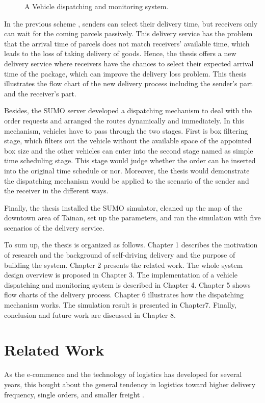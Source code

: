 \documentclass[12pt]{ksthesis}
\begin{document}
\begin{thesis}
{\begin{figure}[t!]
\caption{\large A Vehicle dispatching and monitoring system.}
\vspace{0.5cm}
\label{Fig:System_Overview}
\end{figure}

In the previous scheme \cite{Jiang2018}, senders can select their delivery time, but receivers only can wait for the coming parcels passively. This delivery service has the problem that the arrival time of parcels does not match receivers’ available time, which leads to the loss of taking delivery of goods. Hence, the thesis offers a new delivery service where receivers have the chances to select their expected arrival time of the package, which can improve the delivery loss problem. This thesis illustrates the flow chart of the new delivery process including the sender’s part and the receiver’s part.

Besides, the SUMO server developed a dispatching mechanism to deal with the order requests and arranged the routes dynamically and immediately. In this mechanism, vehicles have to pass through the two stages. First is box filtering stage, which filters out the vehicle without the available space of the appointed box size and the other vehicles can enter into the second stage named as simple time scheduling stage. This stage would judge whether the order can be inserted into the original time schedule or nor. Moreover, the thesis would demonstrate the dispatching mechanism would be applied to the scenario of the sender and the receiver in the different ways.

Finally, the thesis installed the SUMO simulator, cleaned up the map of the downtown area of Tainan, set up the parameters, and ran the simulation with five scenarios of the delivery service.

To sum up, the thesis is organized as follows. Chapter 1 describes the motivation of research and the background of self-driving delivery and the purpose of building the system. Chapter 2 presents the related work. The whole system design overview is proposed in Chapter 3. The implementation of a vehicle dispatching and monitoring system is described in Chapter 4. Chapter 5 shows flow charts of the delivery process.  Chapter 6 illustrates how the dispatching mechanism works. The simulation result is presented in Chapter7. Finally, conclusion and future work are discussed in Chapter 8.


  


\chapter{Related Work} \label{Chap:Related}
As the e-commence and the technology of logistics has developed for several years, this bought about the general tendency in logistics toward higher delivery frequency, single orders, and smaller freight \cite{Visser2014}.

}
\end{thesis}
\end{document}
